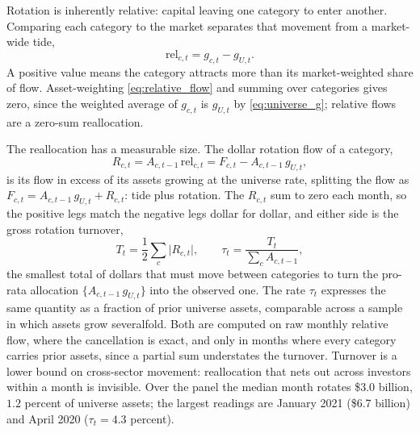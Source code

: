 \documentclass[11pt]{article}
\begin{document}
Rotation is inherently relative: capital leaving one category to enter another. Comparing
each category to the market separates that movement from a market-wide tide,
\begin{equation}
\label{eq:relative_flow}
\mathrm{rel}_{c,t} = g_{c,t} - g_{U,t}.
\end{equation}
A positive value means the category attracts more than its market-weighted share of flow.
Asset-weighting \eqref{eq:relative_flow} and summing over categories gives zero, since the
weighted average of $g_{c,t}$ is $g_{U,t}$ by \eqref{eq:universe_g}; relative flows are a
zero-sum reallocation.

The reallocation has a measurable size. The dollar rotation flow of a category,
\begin{equation}
\label{eq:rotation_dollars}
R_{c,t} = A_{c,t-1}\,\mathrm{rel}_{c,t} = F_{c,t} - A_{c,t-1}\,g_{U,t},
\end{equation}
is its flow in excess of its assets growing at the universe rate, splitting the flow as
$F_{c,t} = A_{c,t-1}\,g_{U,t} + R_{c,t}$: tide plus rotation. The $R_{c,t}$ sum to zero
each month, so the positive legs match the negative legs dollar for dollar, and either
side is the gross rotation turnover,
\begin{equation}
\label{eq:rotation_turnover}
T_t = \frac{1}{2}\sum_c \lvert R_{c,t}\rvert, \qquad
\tau_t = \frac{T_t}{\sum_c A_{c,t-1}},
\end{equation}
the smallest total of dollars that must move between categories to turn the pro-rata
allocation $\{A_{c,t-1}\,g_{U,t}\}$ into the observed one. The rate $\tau_t$ expresses
the same quantity as a fraction of prior universe assets, comparable across a sample in
which assets grow severalfold. Both are computed on raw monthly relative flow, where the
cancellation is exact, and only in months where every category carries prior assets,
since a partial sum understates the turnover. Turnover is a lower bound on cross-sector
movement: reallocation that nets out across investors within a month is invisible. Over
the panel the median month rotates \$3.0 billion, $1.2$ percent of universe assets; the
largest readings are January 2021 (\$6.7 billion) and April 2020 ($\tau_t = 4.3$
percent).
\end{document}
